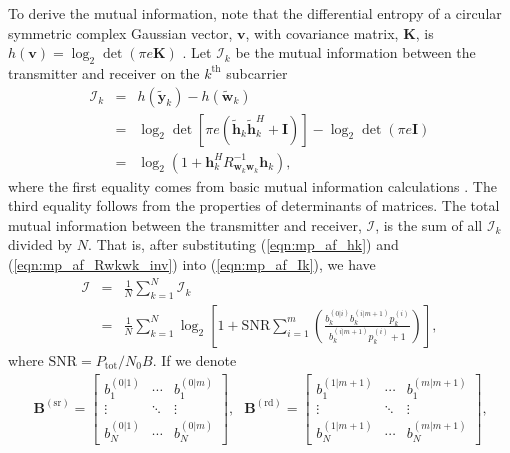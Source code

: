 To derive the mutual information, note that the differential entropy of a circular symmetric complex Gaussian vector, $\mathbf{v}$, with covariance matrix, $\mathbf{K}$, is $h\left(\mathbf{v}\right) = \log_2 \det \left( \pi e \mathbf{K} \right)$ \cite{article:Telatar01}.  Let $\mathcal{I}_k$ be the mutual information between the transmitter and receiver on the $k^{\mbox{th}}$ subcarrier
\begin{eqnarray}
\mathcal{I}_k & = & h\left( \tilde{\mathbf{y}}_k \right) - h \left( \tilde{\mathbf{w}}_k \right)  \\
& = & \log_2 \det\left[ \pi e \left(\tilde{\mathbf{h}}_k \tilde{\mathbf{h}}_k^H + \mathbf{I} \right) \right] 
- \log_2 \det \left( \pi e \mathbf{I} \right)  \\
& = & \log_2 \left( 1 + \mathbf{h}_k^H R_{\mathbf{w}_k\mathbf{w}_k}^{-1} \mathbf{h}_k \right),
\label{eqn:mp_af_Ik}
\end{eqnarray}
where the first equality comes from basic mutual information calculations \cite{book:Cover01}.  The third equality follows from the properties of determinants of matrices.  The total mutual information between the transmitter and receiver, $\mathcal{I}$, is the sum of all $\mathcal{I}_k$ divided by $N$.  That is, after substituting (\ref{eqn:mp_af_hk}) and (\ref{eqn:mp_af_Rwkwk_inv}) into (\ref{eqn:mp_af_Ik}), we have
\begin{eqnarray}
\mathcal{I} & = & \frac{1}{N}  \sum_{k=1}^N \mathcal{I}_k \\
& = & \frac{1}{N}  \sum_{k=1}^N \log_2 \left[ 1 + \mbox{SNR} \sum_{i=1}^m \left(
\frac{b_k^{(0|i)} b_k^{(i|m+1)}p_k^{(i)}  }{ b_k^{(i|m+1)} p_k^{(i)}+1 }\right) \right],
\label{eqn:mp_af_I}
\end{eqnarray}
where $\mbox{SNR} = P_{\mbox{tot}}/N_0B$.  If we denote	
\begin{eqnarray}
\mathbf{B}^{(\mbox{sr})} = \left[ \begin{array}{ccc}
b_1^{(0|1)} & \cdots & b_1^{(0|m)} \\
\vdots & \ddots & \vdots \\
b_N^{(0|1)} & \cdots & b_N^{(0|m)}
\end{array}
\right] \mbox{,} &
\mathbf{B}^{(\mbox{rd})} = \left[ \begin{array}{ccc}
b_1^{(1|m+1)} & \cdots & b_1^{(m|m+1)} \\
\vdots & \ddots & \vdots \\
b_N^{(1|m+1)} & \cdots & b_N^{(m|m+1)}
\end{array}
\right] \mbox{,}
\label{}
\end{eqnarray}

